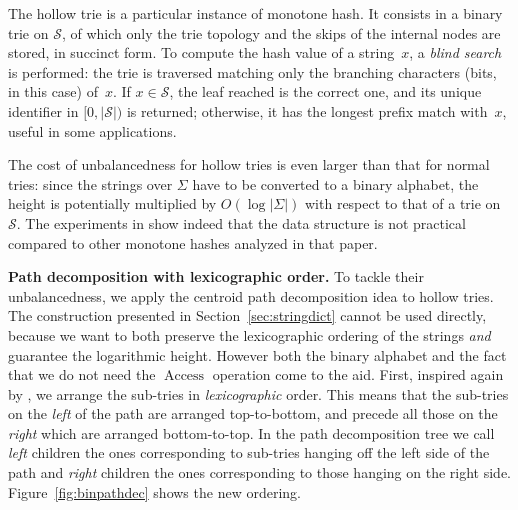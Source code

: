 \documentclass[a4paper,11pt]{article}
\newcommand{\ttlpar}[1]{\noindent\textbf{#1}}
\theoremstyle{nonumberplain}
\DeclareMathOperator{\Access}{Access}
\begin{document}
The hollow trie \cite{monotonehash09} is a particular instance of
monotone hash. It consists in a binary trie on $\mathcal{S}$, of which
only the trie topology and the skips of the internal nodes are stored,
in succinct form. To compute the hash value of a string~$x$, a \emph{blind
  search} is performed: the trie is traversed matching only the
branching characters (bits, in this case) of~$x$. If $x \in
\mathcal{S}$, the leaf reached is the correct one, and its unique
identifier in $[0, |\mathcal{S}|)$ is returned; otherwise, it has the
longest prefix match with~$x$, useful in some applications.

The cost of unbalancedness for hollow tries is even larger than that
for normal tries: since the strings over $\Sigma$ have to be converted
to a binary alphabet, the height is potentially multiplied by $O(\log
|\Sigma|)$ with respect to that of a trie on $\mathcal{S}$. The
experiments in \cite{monotonehash09} show indeed that the data
structure is not practical compared to other monotone hashes
analyzed in that paper.


\ttlpar{Path decomposition with lexicographic order.}
To tackle their unbalancedness, we apply the centroid path
decomposition idea to hollow tries. The construction presented in
Section~\ref{sec:stringdict} cannot be used directly, because we want 
to both preserve the lexicographic ordering of the strings \emph{and} 
guarantee the logarithmic height. However
both the binary alphabet and the fact that we do not need the
$\Access$ operation come to the aid.
First, inspired again by \cite{pods08}, we arrange the sub-tries in
\emph{lexicographic} order. This means that the sub-tries on the
\emph{left} of the path are arranged top-to-bottom, and precede all
those on the \emph{right} which are arranged bottom-to-top. In the
path decomposition tree we call \emph{left} children the ones
corresponding to sub-tries hanging off the left side of the path and
\emph{right} children the ones corresponding to those hanging on the
right side. Figure~\ref{fig:binpathdec} shows the new ordering.
\end{document}
